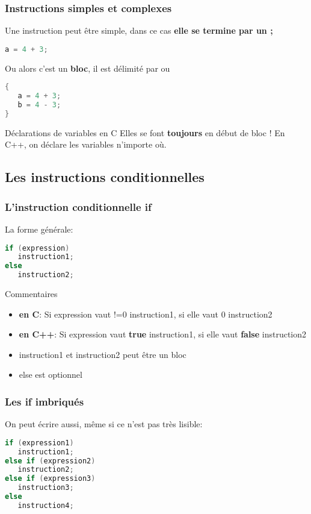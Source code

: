 \documentclass{beamer}
\begin{document}
\begin{frame}[fragile=singleslide,shrink=20]
\frametitle {Instructions simples et complexes}
Une instruction peut être simple, dans ce cas \textbf{elle se termine par un ;}
\begin{lstlisting}[language=c++]
a = 4 + 3;
\end{lstlisting}
Ou alors c'est un \textbf{bloc}, il est délimité par { ou }
\begin{lstlisting}[language=c++]
{
   a = 4 + 3;
   b = 4 - 3;
}
\end{lstlisting}
\begin{block}{Déclarations de variables en C}
Elles se font \textbf{toujours} en début de bloc !
En C++, on déclare les variables n'importe où.
\end{block}
\end{frame}

\subsection{Les instructions conditionnelles}

\begin{frame}[fragile=singleslide,shrink=20]
\frametitle {L'instruction conditionnelle if}

La forme générale:
\begin{lstlisting}[language=c++]
if (expression) 
   instruction1;
else
   instruction2;
\end{lstlisting}

\begin{block}{Commentaires}
\begin{itemize}
\item{\textbf{en C}: Si expression vaut !=0 instruction1, si elle vaut 0 instruction2}
\item{\textbf{en C++}: Si expression vaut \textbf{true} instruction1, si elle vaut \textbf{false} instruction2}
\item{instruction1 et instruction2 peut être un bloc}
\item{else est optionnel}
\end{itemize}
\end{block}
\end{frame}

\begin{frame}[fragile=singleslide,shrink=20]
\frametitle {Les if imbriqués}

On peut écrire aussi, même si ce n'est pas très lisible:
\begin{lstlisting}[language=c++]
if (expression1) 
   instruction1;
else if (expression2)
   instruction2;
else if (expression3)
   instruction3;
else
   instruction4;
\end{lstlisting}
\end{frame}
\end{document}
